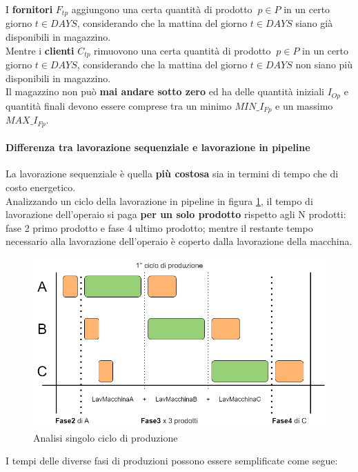 I \textbf{fornitori} \(F_{tp}\) aggiungono una certa quantità di prodotto \(\ p \in P\) in un certo giorno \(t \in DAYS\), considerando che la mattina del giorno \(t \in DAYS\) siano già disponibili in magazzino.\\
Mentre i \textbf{clienti} \(C_{tp}\) rimuovono una certa quantità di prodotto \(\ p \in P\) in un certo giorno \(t \in DAYS\), considerando che la mattina del giorno \(t \in DAYS\) non siano più disponibili in magazzino.\\
Il magazzino non può \textbf{mai andare sotto zero} ed ha delle quantità iniziali \(I_{Op}\) e quantità finali devono essere comprese tra un minimo \(MIN\_I_{Fp}\) e un massimo \(MAX\_I_{Fp}\).

\paragraph{Differenza tra lavorazione sequenziale e lavorazione in pipeline}
La lavorazione sequenziale è quella \textbf{più costosa} sia in termini di tempo che di costo energetico.\\
Analizzando un ciclo della lavorazione in pipeline in figura \ref{fig:analisi_ciclo_di_produzione}, il tempo di lavorazione dell'operaio si paga \textbf{per un solo prodotto} rispetto agli N prodotti: fase 2 primo prodotto e fase 4 ultimo prodotto; 
mentre il restante tempo necessario alla lavorazione dell'operaio è coperto dalla lavorazione della macchina.
\begin{figure}[H]
    \centering
    \includegraphics[width=\textwidth]{media/analisi_ciclo.drawio.png}
    \caption{Analisi singolo ciclo di produzione}
    \label{fig:analisi_ciclo_di_produzione}
\end{figure}
I tempi delle diverse fasi di produzioni possono essere semplificate come segue:

